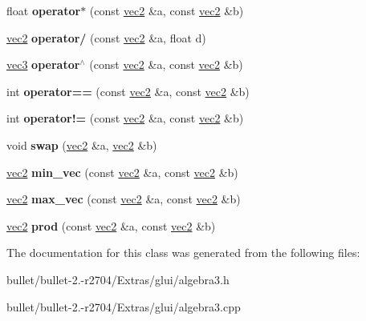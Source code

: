 \begin{DoxyCompactItemize}
\item 
\hypertarget{classvec2_ab2d6c7aa61948785e334abbc6d06af22}{float {\bfseries operator$\ast$} (const \hyperlink{classvec2}{vec2} \&a, const \hyperlink{classvec2}{vec2} \&b)}\label{classvec2_ab2d6c7aa61948785e334abbc6d06af22}

\item 
\hypertarget{classvec2_ac039e11bc3163c3b2a73f618466ba1cc}{\hyperlink{classvec2}{vec2} {\bfseries operator/} (const \hyperlink{classvec2}{vec2} \&a, float d)}\label{classvec2_ac039e11bc3163c3b2a73f618466ba1cc}

\item 
\hypertarget{classvec2_aac6b3e1eec62f338713b46d70c63d7d3}{\hyperlink{classvec3}{vec3} {\bfseries operator$^\wedge$} (const \hyperlink{classvec2}{vec2} \&a, const \hyperlink{classvec2}{vec2} \&b)}\label{classvec2_aac6b3e1eec62f338713b46d70c63d7d3}

\item 
\hypertarget{classvec2_afdf120b1c31612eaba7789d6fda1d8c1}{int {\bfseries operator==} (const \hyperlink{classvec2}{vec2} \&a, const \hyperlink{classvec2}{vec2} \&b)}\label{classvec2_afdf120b1c31612eaba7789d6fda1d8c1}

\item 
\hypertarget{classvec2_aea40727983a519330d962da873e04c51}{int {\bfseries operator!=} (const \hyperlink{classvec2}{vec2} \&a, const \hyperlink{classvec2}{vec2} \&b)}\label{classvec2_aea40727983a519330d962da873e04c51}

\item 
\hypertarget{classvec2_a9b33ecbc9fbb7e87fdbcef79dac05d2a}{void {\bfseries swap} (\hyperlink{classvec2}{vec2} \&a, \hyperlink{classvec2}{vec2} \&b)}\label{classvec2_a9b33ecbc9fbb7e87fdbcef79dac05d2a}

\item 
\hypertarget{classvec2_aff3e8468eb3b4266eb4419946108b775}{\hyperlink{classvec2}{vec2} {\bfseries min\+\_\+vec} (const \hyperlink{classvec2}{vec2} \&a, const \hyperlink{classvec2}{vec2} \&b)}\label{classvec2_aff3e8468eb3b4266eb4419946108b775}

\item 
\hypertarget{classvec2_a63686a4102a83cf5bbce825b19e0e388}{\hyperlink{classvec2}{vec2} {\bfseries max\+\_\+vec} (const \hyperlink{classvec2}{vec2} \&a, const \hyperlink{classvec2}{vec2} \&b)}\label{classvec2_a63686a4102a83cf5bbce825b19e0e388}

\item 
\hypertarget{classvec2_ab34a15f1b0458bd038c54775fe93dbf6}{\hyperlink{classvec2}{vec2} {\bfseries prod} (const \hyperlink{classvec2}{vec2} \&a, const \hyperlink{classvec2}{vec2} \&b)}\label{classvec2_ab34a15f1b0458bd038c54775fe93dbf6}

\end{DoxyCompactItemize}


The documentation for this class was generated from the following files\+:\begin{DoxyCompactItemize}
\item 
bullet/bullet-\/2.-\/r2704/\+Extras/glui/algebra3.\+h\item 
bullet/bullet-\/2.-\/r2704/\+Extras/glui/algebra3.\+cpp\end{DoxyCompactItemize}
